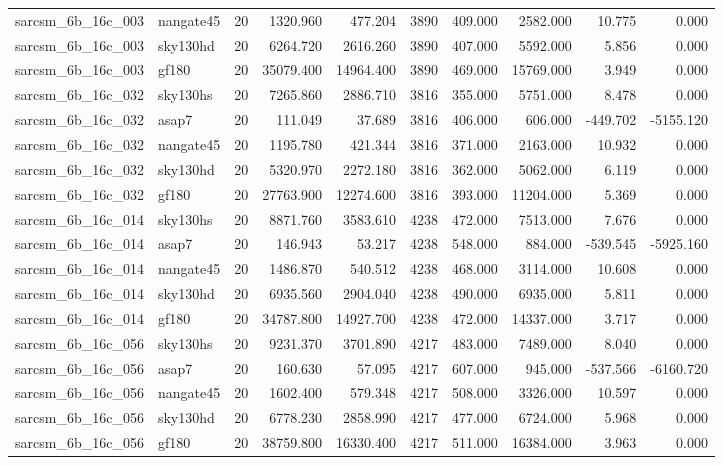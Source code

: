 \begin{tabular}{llrrrrrrrr}
sarcsm\_6b\_16c\_003 & nangate45 & 20 & 1320.960 & 477.204 & 3890 & 409.000 & 2582.000 & 10.775 & 0.000 \\
sarcsm\_6b\_16c\_003 & sky130hd & 20 & 6264.720 & 2616.260 & 3890 & 407.000 & 5592.000 & 5.856 & 0.000 \\
sarcsm\_6b\_16c\_003 & gf180 & 20 & 35079.400 & 14964.400 & 3890 & 469.000 & 15769.000 & 3.949 & 0.000 \\
sarcsm\_6b\_16c\_032 & sky130hs & 20 & 7265.860 & 2886.710 & 3816 & 355.000 & 5751.000 & 8.478 & 0.000 \\
sarcsm\_6b\_16c\_032 & asap7 & 20 & 111.049 & 37.689 & 3816 & 406.000 & 606.000 & -449.702 & -5155.120 \\
sarcsm\_6b\_16c\_032 & nangate45 & 20 & 1195.780 & 421.344 & 3816 & 371.000 & 2163.000 & 10.932 & 0.000 \\
sarcsm\_6b\_16c\_032 & sky130hd & 20 & 5320.970 & 2272.180 & 3816 & 362.000 & 5062.000 & 6.119 & 0.000 \\
sarcsm\_6b\_16c\_032 & gf180 & 20 & 27763.900 & 12274.600 & 3816 & 393.000 & 11204.000 & 5.369 & 0.000 \\
sarcsm\_6b\_16c\_014 & sky130hs & 20 & 8871.760 & 3583.610 & 4238 & 472.000 & 7513.000 & 7.676 & 0.000 \\
sarcsm\_6b\_16c\_014 & asap7 & 20 & 146.943 & 53.217 & 4238 & 548.000 & 884.000 & -539.545 & -5925.160 \\
sarcsm\_6b\_16c\_014 & nangate45 & 20 & 1486.870 & 540.512 & 4238 & 468.000 & 3114.000 & 10.608 & 0.000 \\
sarcsm\_6b\_16c\_014 & sky130hd & 20 & 6935.560 & 2904.040 & 4238 & 490.000 & 6935.000 & 5.811 & 0.000 \\
sarcsm\_6b\_16c\_014 & gf180 & 20 & 34787.800 & 14927.700 & 4238 & 472.000 & 14337.000 & 3.717 & 0.000 \\
sarcsm\_6b\_16c\_056 & sky130hs & 20 & 9231.370 & 3701.890 & 4217 & 483.000 & 7489.000 & 8.040 & 0.000 \\
sarcsm\_6b\_16c\_056 & asap7 & 20 & 160.630 & 57.095 & 4217 & 607.000 & 945.000 & -537.566 & -6160.720 \\
sarcsm\_6b\_16c\_056 & nangate45 & 20 & 1602.400 & 579.348 & 4217 & 508.000 & 3326.000 & 10.597 & 0.000 \\
sarcsm\_6b\_16c\_056 & sky130hd & 20 & 6778.230 & 2858.990 & 4217 & 477.000 & 6724.000 & 5.968 & 0.000 \\
sarcsm\_6b\_16c\_056 & gf180 & 20 & 38759.800 & 16330.400 & 4217 & 511.000 & 16384.000 & 3.963 & 0.000 \\

\end{tabular}
